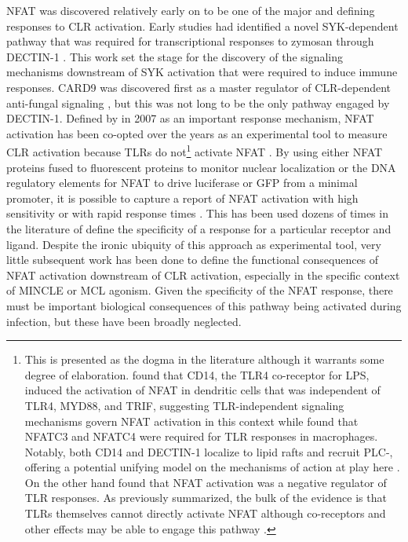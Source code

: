 NFAT was discovered relatively early on to be one of the major and defining responses to CLR activation. Early studies had identified a novel SYK-dependent pathway that was required for transcriptional responses to zymosan through DECTIN-1 \citep{Rogers2005}. This work set the stage for the discovery of the signaling mechanisms downstream of SYK activation that were required to induce immune responses. CARD9 was discovered first as a master regulator of CLR-dependent anti-fungal signaling \citep{Gross2006}, but this was not long to be the only pathway engaged by DECTIN-1. Defined by \citeauthor{Goodridge2007} in 2007 as an important response mechanism, NFAT activation has been co-opted over the years as an experimental tool to measure CLR activation because TLRs do not\footnote{This is presented as the dogma in the literature although it warrants some degree of elaboration. \citeauthor{Zanoni2009} found that CD14, the TLR4 co-receptor for LPS, induced the activation of NFAT in dendritic cells that was independent of TLR4, MYD88, and TRIF, suggesting TLR-independent signaling mechanisms govern NFAT activation in this context while \citeauthor{Minematsu2011} found that NFATC3 and NFATC4 were required for TLR responses in macrophages. Notably, both CD14 and DECTIN-1 localize to lipid rafts and recruit PLC-, offering a potential unifying model on the mechanisms of action at play here \citep{Xu2009}. On the other hand \citeauthor{Kang2007} found that NFAT activation was a negative regulator of TLR responses. As previously summarized, the bulk of the evidence is that TLRs themselves cannot directly activate NFAT although co-receptors and other effects may be able to engage this pathway \citep{Zanoni2012}.} activate NFAT \citep{Yamasaki2009, Richardson2014, Ishikawa2013, Furukawa2013, Hattori2014}. By using either NFAT proteins fused to fluorescent proteins to monitor nuclear localization or the DNA regulatory elements for NFAT to drive luciferase or GFP from a minimal promoter, it is possible to capture a report of NFAT activation with high sensitivity or with rapid response times \citep{Colella2008, Gwack2006, Kar2015, Kar2016, Jauliac2002, Wilkins2004, Chow1999, Aramburu1998}. This has been used dozens of times in the literature of define the specificity of a response for a particular receptor and ligand. Despite the ironic ubiquity of this approach as experimental tool, very little subsequent work has been done to define the functional consequences of NFAT activation downstream of CLR activation, especially in the specific context of MINCLE or MCL agonism. Given the specificity of the NFAT response, there must be important biological consequences of this pathway being activated during infection, but these have been broadly neglected. 

